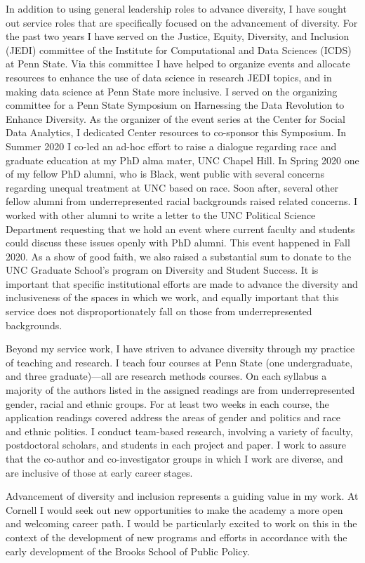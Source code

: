 \documentclass[a4paper, 12pt]{article}
\begin{document}
In addition to using general leadership roles to advance diversity, I have sought out service roles that are specifically focused on the advancement of diversity. For the past two years I have served on the Justice, Equity, Diversity, and Inclusion (JEDI) committee of the Institute for Computational and Data Sciences (ICDS) at Penn State. Via this committee I have helped to organize events and allocate resources to enhance the use of data science in research JEDI topics, and in making data science at Penn State more inclusive. I served on the organizing committee for a Penn State Symposium on Harnessing the Data Revolution to Enhance Diversity. As the organizer of the event series at the Center for Social Data Analytics, I dedicated Center resources to co-sponsor this Symposium. In Summer 2020 I co-led an ad-hoc effort to raise a dialogue regarding race and graduate education at my PhD alma mater, UNC Chapel Hill. In Spring 2020 one of my fellow PhD alumni, who is Black, went public with several concerns regarding unequal treatment at UNC based on race. Soon after, several other fellow alumni from underrepresented racial backgrounds raised related concerns. I worked with other alumni to write a letter to the UNC Political Science Department requesting that we hold an event where current faculty and students could discuss these issues openly with PhD alumni. This event happened in Fall 2020. As a show of good faith, we also raised a substantial sum to donate to the UNC Graduate School's program on Diversity and Student Success. It is important that specific institutional efforts are made to advance the diversity and inclusiveness of the spaces in which we work, and equally important that this service does not disproportionately fall on those from underrepresented backgrounds.

Beyond my service work, I have striven to advance diversity through my practice of teaching and research. I teach four courses at Penn State (one undergraduate, and three graduate)---all are research methods courses. On each syllabus a majority of the authors listed in the assigned readings are from underrepresented gender, racial and ethnic groups. For at least two weeks in each course, the application readings covered address the areas of gender and politics and race and ethnic politics. I conduct team-based research, involving a variety of faculty, postdoctoral scholars, and students in each project and paper. I work to assure that the co-author and co-investigator groups in which I work are diverse, and are inclusive of those at early career stages. 

Advancement of diversity and inclusion represents a guiding value in my work. At Cornell I would seek out new opportunities to make the academy a more open and welcoming career path. I would be particularly excited to work on this in the context of the development of new programs and efforts in accordance with the early development of the Brooks School of Public Policy.  
\end{document}
